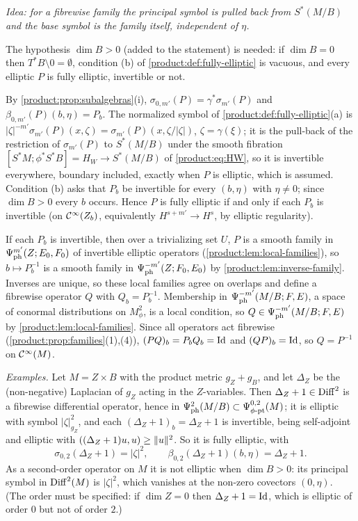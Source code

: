 \subsection*{}
\emph{Idea: for a fibrewise family the principal symbol is pulled back from
$S^*(M/B)$ and the base symbol is the family itself, independent of $\eta$.}

The hypothesis $\dim B>0$ (added to the statement) is needed: if $\dim B=0$ then
$T^*B\setminus0=\emptyset$, condition (b) of \cref{product:def:fully-elliptic} is
vacuous, and every elliptic $P$ is fully elliptic, invertible or not.

By \cref{product:prop:subalgebras}(i), $\sigma_{0,m'}(P)=\gamma^*\sigma_{m'}(P)$ and
$\beta_{0,m'}(P)(b,\eta)=P_b$. The normalized symbol of
\cref{product:def:fully-elliptic}(a) is $|\zeta|^{-m'}\sigma_{m'}(P)(x,\zeta)=
\sigma_{m'}(P)(x,\zeta/|\zeta|)$, $\zeta=\gamma(\xi)$; it is the pull-back of the
restriction of $\sigma_{m'}(P)$ to $S^*(M/B)$ under the smooth fibration
$[S^*M;\phi^*S^*B]=H_W\to S^*(M/B)$ of \eqref{product:eq:HW}, so it is invertible
everywhere, boundary included, exactly when $P$ is elliptic, which is assumed.
Condition (b) asks that $P_b$ be invertible for every $(b,\eta)$ with $\eta\ne0$; since
$\dim B>0$ every $b$ occurs. Hence $P$ is fully elliptic if and only if each $P_b$ is
invertible (on $\mathcal{C}^\infty(Z_b)$, equivalently $H^{s+m'}\to H^s$, by elliptic regularity).

If each $P_b$ is invertible, then over a trivializing set $U$, $P$ is a smooth family
in $\Psi^{m'}_{\mathrm{ph}}(Z;E_0,F_0)$ of invertible elliptic operators
(\cref{product:lem:local-families}), so $b\mapsto P_b^{-1}$ is a smooth family in
$\Psi^{-m'}_{\mathrm{ph}}(Z;F_0,E_0)$ by \cref{product:lem:inverse-family}. Inverses
are unique, so these local families agree on overlaps and define a fibrewise
operator $Q$ with $Q_b=P_b^{-1}$. Membership in $\Psi^{-m'}_{\mathrm{ph}}(M/B;F,E)$,
a space of conormal distributions on $M^2_\phi$, is a local condition, so
$Q\in\Psi^{-m'}_{\mathrm{ph}}(M/B;F,E)$ by
\cref{product:lem:local-families}. Since all operators act fibrewise
(\cref{product:prop:families}(1),(4)), $(PQ)_b=P_bQ_b=\operatorname{Id}$ and $(QP)_b=\operatorname{Id}$, so
$Q=P^{-1}$ on $\mathcal{C}^\infty(M)$.

\emph{Examples.} Let $M=Z\times B$ with the product metric $g_Z+g_B$, and let
$\Delta_Z$ be the (non-negative) Laplacian of $g_Z$ acting in the $Z$-variables. Then
$\Delta_Z+1\in\operatorname{Diff}^{2}$ is a fibrewise differential operator, hence in
$\Psi^{2}_{\mathrm{ph}}(M/B)\subset\Psi^{0,2}_{\phi\text{-}\mathrm{pt}}(M)$; it is elliptic with symbol $|\zeta|^2_{g_Z}$, and
each $(\Delta_Z+1)_b=\Delta_Z+1$ is invertible, being self-adjoint and elliptic with
$( (\Delta_Z+1)u, u)\ge\lVert u\rVert^2$. So it is fully elliptic, with
\begin{equation*}
\sigma_{0,2}(\Delta_Z+1)=|\zeta|^2,\qquad\beta_{0,2}(\Delta_Z+1)(b,\eta)=\Delta_Z+1 .
\end{equation*}
As a second-order operator on $M$ it is not elliptic when $\dim B>0$: its principal
symbol in $\operatorname{Diff}^{2}(M)$ is $|\zeta|^2$, which vanishes at the non-zero covectors
$(0,\eta)$. (The order must be specified: if $\dim Z=0$ then $\Delta_Z+1=\operatorname{Id}$, which
is elliptic of order $0$ but not of order $2$.)


